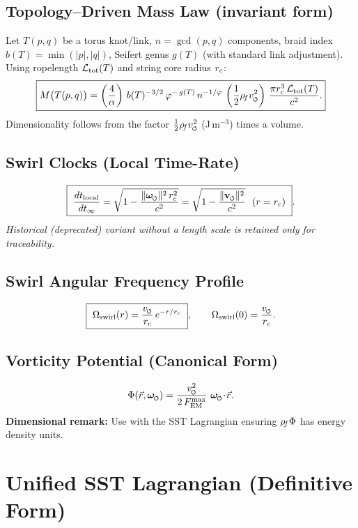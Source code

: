 \documentclass[11pt]{article}
\begin{document}
    \subsection{Topology–Driven Mass Law (invariant form)}
    Let \(T(p,q)\) be a torus knot/link, \(n=\gcd(p,q)\) components, braid index \(b(T)=\min(|p|,|q|)\), Seifert genus \(g(T)\) (with standard link adjustment). Using ropelength \(\mathcal{L}_{\rm tot}(T)\) and string core radius \(r_c\):
    \[
        \boxed{
            M\big(T(p,q)\big)
            =\left(\frac{4}{\alpha}\right)\,
            b(T)^{-3/2}\,
            \varphi^{-\,g(T)}\,
            n^{-1/\varphi}\,
            \left(\frac{1}{2}\rhof \vscore^2\right)\,
            \frac{\pi \rc^3\,\mathcal{L}_{\mathrm{tot}}(T)}{c^2}.
        }
    \]
    Dimensionality follows from the factor \(\tfrac12\rhof \vscore^2\) (J\,m\(^{-3}\)) times a volume.

    \subsection{Swirl Clocks (Local Time-Rate)}
        \label{sec:swirl_clocks}
    \[
        \boxed{\ \frac{dt_{\text{local}}}{dt_{\infty}}
            = \sqrt{1 - \frac{\lVert\omegas\rVert^{2}\,\rc^{2}}{c^{2}}}
            = \sqrt{1 - \frac{\lVert\vswirl\rVert^{2}}{c^{2}}}\ \ (r=\rc)\ }.
    \]
    \emph{Historical (deprecated) variant without a length scale is retained only for traceability.}

    \subsection{Swirl Angular Frequency Profile}
    \[
        \boxed{\ \Omega_{\text{swirl}}(r) = \frac{\vscore}{\rc}\, e^{-r/\rc}\ },
        \qquad
        \Omega_{\text{swirl}}(0)=\frac{\vscore}{\rc}.
    \]

    \subsection{Vorticity Potential (Canonical Form)}
    \[
        \Phi(\vec r,\omegas) = \frac{\vscore^{2}}{2\,F_{\text{EM}}^{\max}}\ \omegas\!\cdot\!\vec r.
    \]
    \textbf{Dimensional remark:} Use with the SST Lagrangian ensuring \(\rho_{\!f}\Phi\) has energy density units.

    \section{Unified SST Lagrangian (Definitive Form)}
    \label{sec:lagrangian}
\end{document}
